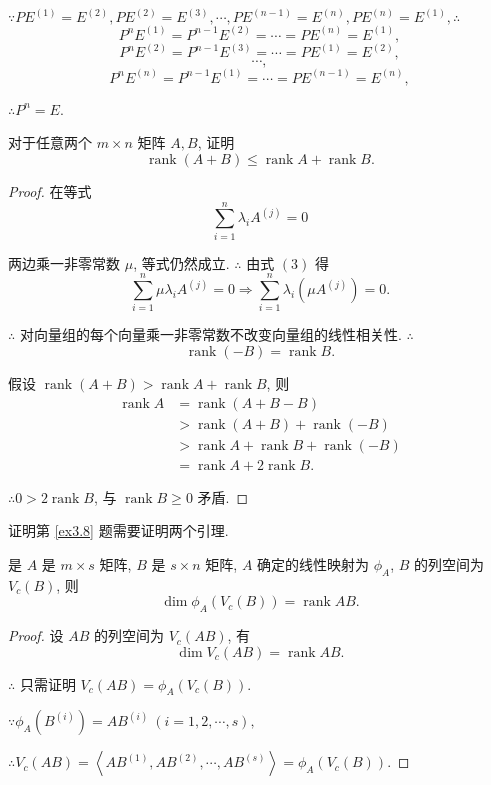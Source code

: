 \documentclass{ctexart}
\begin{document}
\begin{solution}
    $\because PE^{(1)}=E^{(2)},PE^{(2)}=E^{(3)},\cdots,PE^{(n-1)}=E^{(n)},PE^{(n)}=E^{(1)},\therefore$
    \[P^{n}E^{(1)}=P^{n-1}E^{(2)}=\cdots=PE^{(n)}=E^{(1)},\]
    \[P^{n}E^{(2)}=P^{n-1}E^{(3)}=\cdots=PE^{(1)}=E^{(2)},\]
    \[\cdots,\]
    \[P^{n}E^{(n)}=P^{n-1}E^{(1)}=\cdots=PE^{(n-1)}=E^{(n)},\]

    $\therefore P^n=E$.
\end{solution}
\begin{exercise}%
    对于任意两个 $m\times n$ 矩阵 $A,B$, 证明
    \[\operatorname{rank}(A+B)\leq\operatorname{rank}A+\operatorname{rank}B.\]
\end{exercise}
\begin{proof}
    在等式
    \begin{equation}
        \sum\limits_{i=1}^n\lambda_iA^{(j)}=0
    \end{equation}

    两边乘一非零常数 $\mu$, 等式仍然成立. $\therefore$ 由式 $(3)$ 得
    \[\sum\limits_{i=1}^n\mu\lambda_iA^{(j)}=0\Rightarrow\sum\limits_{i=1}^n\lambda_i(\mu A^{(j)})=0.\]

    $\therefore$ 对向量组的每个向量乘一非零常数不改变向量组的线性相关性. $\therefore$
    \[\operatorname{rank}(-B)=\operatorname{rank}B.\]

    假设 $\operatorname{rank}(A+B)>\operatorname{rank}A+\operatorname{rank}B$, 则
    \begin{align*}
        \operatorname{rank}A & =\operatorname{rank}(A+B-B) \\
        & >\operatorname{rank}(A+B)+\operatorname{rank}(-B) \\
        & >\operatorname{rank}A+\operatorname{rank}B+\operatorname{rank}(-B) \\
        & =\operatorname{rank}A+2\operatorname{rank}B.
    \end{align*}

    $\therefore 0>2\operatorname{rank}B$, 与 $\operatorname{rank}B\geq0$ 矛盾.
\end{proof}
证明第 \ref{ex3.8} 题需要证明两个引理.
\begin{lemma}\label{l2.2}
    是 $A$ 是 $m\times s$ 矩阵, $B$ 是 $s\times n$ 矩阵, $A$ 确定的线性映射为 $\phi_A$, $B$ 的列空间为 $V_c(B)$, 则
    \[\dim\phi_A(V_c(B))=\operatorname{rank}AB.\]
\end{lemma}
\begin{proof}
    设 $AB$ 的列空间为 $V_c(AB)$, 有
    \[\dim V_c(AB)=\operatorname{rank}AB.\]

    $\therefore$ 只需证明 $V_c(AB)=\phi_A(V_c(B))$.

    $\because\phi_A(B^{(i)})=AB^{(i)}\ (i=1,2,\cdots,s),$

    $\therefore V_c(AB)=\left<AB^{(1)},AB^{(2)},\cdots,AB^{(s)}\right>=\phi_A(V_c(B))$.
\end{proof}
\end{document}
